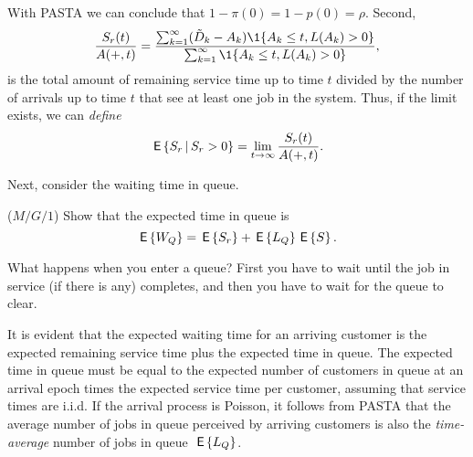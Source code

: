 \begin{exercise}
\begin{solution}
\begin{equation*}
\end{equation*}
With PASTA we can conclude that $1-\pi(0) = 1-p(0)= \rho$. Second,
\begin{equation*}
\frac{S_r(t)}{A(+,t)} 
= \frac{\sum_{k=1}^\infty (\tilde D_k - A_k) \1{A_k\leq t, L(A_k) > 0}}{\sum_{k=1}^\infty \1{A_k\leq t, L(A_k)>0}},
\end{equation*}
is the total amount of remaining service time up to time $t$ divided by
the number of arrivals up to time $t$ that see at least one job in the system. Thus, 
if the limit exists, we can \emph{define}
\begin{equation*}
\,\mathsf{E}\left\{S_r \,\middle|\, S_r>0\right\}  =\lim_{t\to\infty} \frac{S_r(t)}{A(+,t)}.
\end{equation*}
  \end{solution}
\end{exercise}

Next, consider the waiting time in queue.  
\begin{exercise}($M/G/1$)
Show  that the expected time in queue is
\begin{equation}\label{eq:24}
  \,\mathsf{E}\left\{W_Q\right\} = \,\mathsf{E}\left\{S_r\right\} + \,\mathsf{E}\left\{L_Q\right\} \,\mathsf{E}\left\{S\right\}.
\end{equation}
\begin{hint}
  What happens when you enter a queue? First you have to wait until the job in service (if there is any) completes, and then you have to wait for the queue to clear.
\end{hint}
\begin{solution}
It is evident that the expected waiting time for an arriving customer is the expected
remaining service time plus the expected time in queue. The expected
time in queue  must be equal to the expected number of
customers in queue at an arrival epoch times the expected service time
per customer, assuming that service times are i.i.d. If the arrival
process is Poisson, it follows from PASTA that the average number of
jobs in queue perceived by arriving customers is also the
\emph{time-average} number of jobs in queue~$\,\mathsf{E}\left\{L_Q\right\}$.  
\end{solution}
\end{exercise}
 
